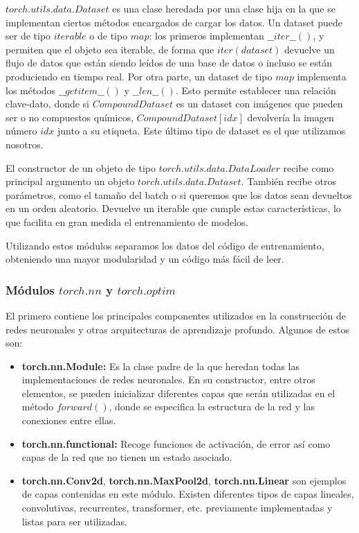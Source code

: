 $torch.utils.data.Dataset$ es una clase heredada por una clase hija en la que se implementan ciertos métodos encargados de cargar los datos. Un dataset puede ser de tipo $iterable$ o de tipo $map$: los primeros implementan $\_\_iter\_\_()$, y permiten que el objeto sea iterable, de forma que $iter(dataset)$ devuelve un flujo de datos que están siendo leídos de una base de datos o incluso se están produciendo en tiempo real. Por otra parte, un dataset de tipo $map$ implementa los métodos $\_\_getitem\_\_()$ y $\_\_len\_\_()$. Esto permite establecer una relación clave-dato, donde si $CompoundDataset$ es un dataset con imágenes que pueden ser o no compuestos químicos, $CompoundDataset[idx]$ devolvería la imagen número $idx$ junto a su etiqueta. Este último tipo de dataset es el que utilizamos nosotros.

El constructor de un objeto de tipo $torch.utils.data.DataLoader$ recibe como principal argumento un objeto $torch.utils.data.Dataset$. También recibe otros parámetros, como el tamaño del batch o si queremos que los datos sean devueltos en un orden aleatorio. Devuelve un iterable que cumple estas características, lo que facilita en gran medida el entrenamiento de modelos. 

Utilizando estos módulos separamos los datos del código de entrenamiento, obteniendo una mayor modularidad y un código más fácil de leer. \cite{pytorch-doc}

\subsubsection{Módulos $torch.nn$ y $torch.optim$}
El primero contiene los principales componentes utilizados en la construcción de redes neuronales y otras arquitecturas de aprendizaje profundo. Algunos de estos son:

\begin{itemize}
    \item \textbf{torch.nn.Module:} Es la clase padre de la que heredan todas las implementaciones de redes neuronales. En su constructor, entre otros elementos, se pueden inicializar diferentes capas que serán utilizadas en el método $forward()$, donde se especifica la estructura de la red y las conexiones entre ellas.
    \item \textbf{torch.nn.functional:} Recoge funciones de activación, de error así como capas de la red que no tienen un estado asociado.
    \item \textbf{torch.nn.Conv2d}, \textbf{torch.nn.MaxPool2d}, \textbf{torch.nn.Linear} son ejemplos de capas contenidas en este módulo. Existen diferentes tipos de capas lineales, convolutivas, recurrentes, transformer, etc. previamente implementadas y listas para ser utilizadas.
\end{itemize}

